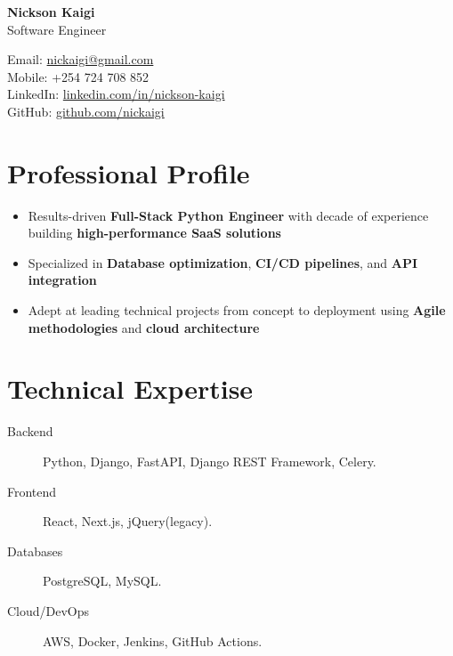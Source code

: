 \documentclass[11pt]{article} %
\begin{document}
\begin{center}
    \begin{minipage}{0.5\textwidth}
    {\Huge\bfseries
        \texorpdfstring{Nickson Kaigi}{Nickson Kaigi}
        } \\ \medskip
        Software Engineer
    \end{minipage} \hfill
    \begin{minipage}{0.4\textwidth}
        \raggedleft
        Email: \href{mailto:nickaigi@gmail.com}{nickaigi@gmail.com} \\
        Mobile: +254 724 708 852 \\
        LinkedIn: \href{https://www.linkedin.com/in/nickson-kaigi/}{linkedin.com/in/nickson-kaigi} \\
        GitHub: \href{https://github.com/nickaigi}{github.com/nickaigi}
    \end{minipage}
\end{center}

\section{Professional Profile}
\begin{itemize}
    \item Results-driven \textbf{Full-Stack Python Engineer} with decade of experience building \textbf{high-performance SaaS solutions}
    \item Specialized in \textbf{Database optimization}, \textbf{CI/CD pipelines}, and \textbf{API integration}
    \item Adept at leading technical projects from concept to deployment using \textbf{Agile methodologies} and \textbf{cloud architecture}
\end{itemize}

\section{Technical Expertise}
\begin{description}
    \item[Backend] Python, Django, FastAPI, Django REST Framework, Celery.
    \item[Frontend] React, Next.js, jQuery(legacy).
    \item[Databases] PostgreSQL, MySQL.
    \item[Cloud/DevOps] AWS, Docker, Jenkins, GitHub Actions.
\end{description}
\end{document}
